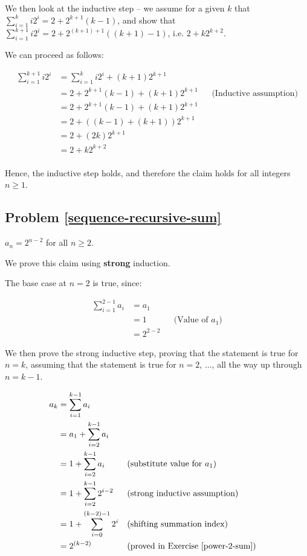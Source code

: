 We then look at the inductive step -- we assume for a given $k$ that $\sum_{i=1}^{k} i2^i = 2+2^{k+1}(k-1)$, and show that $\sum_{i=1}^{k+1} i2^i = 2+2^{(k+1)+1}((k+1)-1)$, i.e. $2+k2^{k+2}$. 

We can proceed as follows:

\begin{align*}
\sum_{i=1}^{k+1} i2^i &= \sum_{i=1}^{k} i2^i + (k+1)2^{k+1} \\
&= 2+2^{k+1}(k-1) + (k+1)2^{k+1} && \text{(Inductive assumption)} \\
&= 2+2^{k+1}(k-1) + (k+1)2^{k+1} \\
&= 2+((k-1) + (k+1))2^{k+1} \\
&= 2+(2k)2^{k+1} \\
&= 2+k2^{k+2} \\
\end{align*}

Hence, the inductive step holds, and therefore the claim holds for all integers $n \geq 1$. 


\subsection{Problem \ref{sequence-recursive-sum}}

$a_n = 2^{n-2}$ for all $n \geq 2$. 


We prove this claim using \textbf{strong} induction. 

The base case at $n = 2$ is true, since:

\begin{align*}
\sum_{i=1}^{2-1} a_i &= a_1 \\
&= 1 && \text{(Value of $a_1$)} \\
&= 2^{2-2}
\end{align*}

We then prove the strong inductive step, proving that the statement is true for $n = k$, assuming that the statement is true for $n = 2$, ..., all the way up through $n = k - 1$.

\begin{align*}
a_k &= \sum_{i=1}^{k-1} a_i \\
&= a_1 + \sum_{i=2}^{k-1} a_i \\
&= 1 + \sum_{i=2}^{k-1} a_i && \text{(substitute value for $a_1$)} \\
&= 1 + \sum_{i=2}^{k-1} 2^{i-2} && \text{(strong inductive assumption)} \\
&= 1 + \sum_{i=0}^{(k-2)-1} 2^i && \text{(shifting summation index)} \\
&= 2^{(k-2)} && \text{(proved in Exercise \ref{power-2-sum})}
\end{align*}

